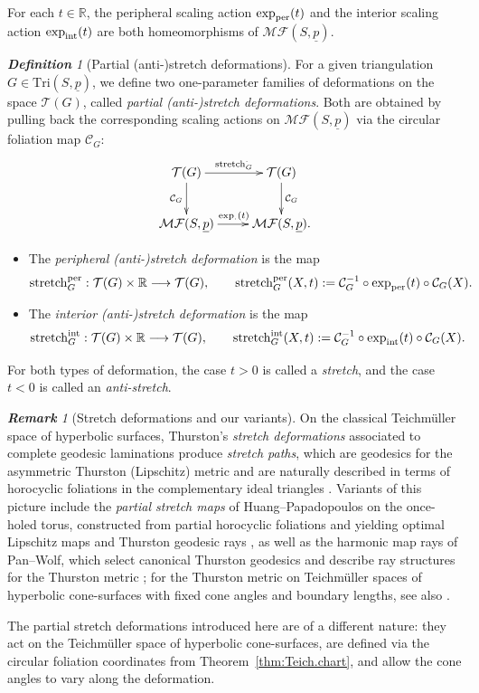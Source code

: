 \documentclass[11pt, letterpaper]{amsart}
\theoremstyle{definition}
\theoremstyle{remark}
\newtheorem{definition}[theorem]{\rm\bf Definition}
\newtheorem{remark}[theorem]{\rm\bf Remark}
\newcommand{\up}{\underline{p}}
\newcommand{\Sp}{(S,\up)}
\newcommand{\TSp}{\text{Tri}\Sp}
\newcommand{\cMFp}{\mathcal{MF} (S,\up)}
\newcommand{\cC}{\mathcal{C}}
\newcommand{\cT}{\mathcal{T}}
\newcommand{\bR}{\mathbb{R}}
\newcommand{\DEF}{} \newcommand{\WARN}{\textcolor{red}} \newcommand{\ALT}{\textcolor{brown}} \newcommand{\TODO}{\textcolor{teal}} %
\numberwithin{equation}{section}
\begin{document}
For each $t\in\bR$, the peripheral scaling action ${\rm exp}_{\mathrm{per}}(t)$ and the interior scaling action ${\rm exp}_{\mathrm{int}}(t)$ are both homeomorphisms of $\cMFp$.

\begin{definition}[Partial (anti-)stretch deformations]
\label{def:part.stret.}
For a given triangulation $G \in \TSp$, we define two one-parameter families of deformations on the space $\cT(G)$, called \DEF{\em partial (anti-)stretch deformations}. 
Both are obtained by pulling back the corresponding scaling actions on $\cMFp$ via the circular foliation map $\cC_G$:
\[
 \xymatrix{
  \cT(G) \ar[d]_{\cC_G} \ar[r]^{{\rm stretch}_G^{\cdot}} & \cT(G) \ar[d]^{\cC_G}  \\
  \cMFp \ar[r]^{{\rm exp}_{\cdot}(t)} &  \cMFp .
 }
\]

\begin{itemize}
    \item The \DEF{\em peripheral (anti-)stretch deformation} is the map
    \[
      {\rm stretch}^{\mathrm{per}}_G : \cT(G) \times \mathbb{R} \longrightarrow \cT(G),\qquad
      {\rm stretch}^{\mathrm{per}}_G(X,t) := \cC_G^{-1} \circ {\rm exp}_{\mathrm{per}}(t) \circ \cC_G(X).
    \]
    
    \item The \DEF{\em interior (anti-)stretch deformation} is the map
    \[
      {\rm stretch}^{\mathrm{int}}_G : \cT(G) \times \mathbb{R} \longrightarrow \cT(G),\qquad
      {\rm stretch}^{\mathrm{int}}_G(X,t) := \cC_G^{-1} \circ {\rm exp}_{\mathrm{int}}(t) \circ \cC_G(X).
    \]
\end{itemize}
For both types of deformation, the case $t > 0$ is called a \DEF{\em stretch}, and the case $t < 0$ is called an \DEF{\em anti-stretch}.
\end{definition}

\begin{remark}[Stretch deformations and our variants]
\label{rem:HP-vs-us}
On the classical Teichm\"uller space of hyperbolic surfaces, Thurston's \emph{stretch deformations} associated to complete geodesic laminations produce \emph{stretch paths}, which are geodesics for the asymmetric Thurston (Lipschitz) metric and are naturally described in terms of horocyclic foliations in the complementary ideal triangles \cite{Thu98}. 
Variants of this picture include the \emph{partial stretch maps} of Huang--Papadopoulos on the once-holed torus, constructed from partial horocyclic foliations and yielding optimal Lipschitz maps and Thurston geodesic rays \cite{HP21}, as well as the harmonic map rays of Pan--Wolf, which select canonical Thurston geodesics and describe ray structures for the Thurston metric \cite{PW22}; for the Thurston metric on Teichm\"uller spaces of hyperbolic cone-surfaces with fixed cone angles and boundary lengths, see also \cite{Pan17}.

The partial stretch deformations introduced here are of a different nature: 
they act on the Teichm\"uller space of hyperbolic cone-surfaces, are defined via the circular foliation coordinates from Theorem~\ref{thm:Teich.chart}, and allow the cone angles to vary along the deformation. 
\end{remark}
\end{document}
